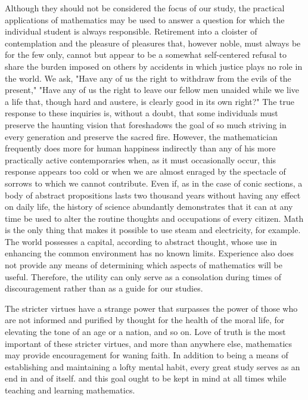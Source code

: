 \documentclass[a4paper,12pt]{book}[2004/02/16]
\theoremstyle{ilemma}
\theoremstyle{itheorem}
\theoremstyle{iother}
\theoremstyle{icorollary}
\theoremstyle{numcorollary}
\theoremstyle{idefinition}
\begin{document}
Although they should not be considered the focus of our study, the practical applications of mathematics may be used to answer a question for which the individual student is always responsible. Retirement into a cloister of contemplation and the pleasure of pleasures that, however noble, must always be for the few only, cannot but appear to be a somewhat self-centered refusal to share the burden imposed on others by accidents in which justice plays no role in the world. We ask, "Have any of us the right to withdraw from the evils of the present," "Have any of us the right to leave our fellow men unaided while we live a life that, though hard and austere, is clearly good in its own right?" The true response to these inquiries is, without a doubt, that some individuals must preserve the haunting vision that foreshadows the goal of so much striving in every generation and preserve the sacred fire. However, the mathematician frequently does more for human happiness indirectly than any of his more practically active contemporaries when, as it must occasionally occur, this response appears too cold or when we are almost enraged by the spectacle of sorrows to which we cannot contribute. Even if, as in the case of conic sections, a body of abstract propositions lasts two thousand years without having any effect on daily life, the history of science abundantly demonstrates that it can at any time be used to alter the routine thoughts and occupations of every citizen. Math is the only thing that makes it possible to use steam and electricity, for example. The world possesses a capital, according to abstract thought, whose use in enhancing the common environment has no known limits. Experience also does not provide any means of determining which aspects of mathematics will be useful. Therefore, the utility can only serve as a consolation during times of discouragement rather than as a guide for our studies.

The stricter virtues have a strange power that surpasses the power of those who are not informed and purified by thought for the health of the moral life, for elevating the tone of an age or a nation, and so on. Love of truth is the most important of these stricter virtues, and more than anywhere else, mathematics may provide encouragement for waning faith.
In addition to being a means of establishing and maintaining a lofty mental habit, every great study serves as an end in and of itself. and this goal ought to be kept in mind at all times while teaching and learning mathematics.
\end{document}

